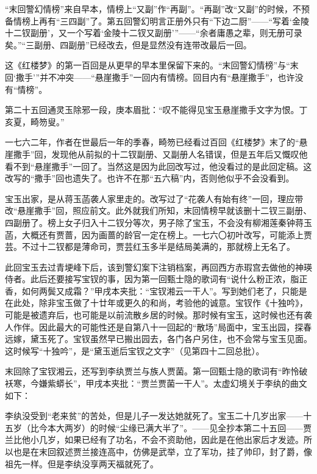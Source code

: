 \par “末回警幻情榜”来自早本，情榜上“又副”作“再副”。“再副”改“又副”的时候，不预备情榜上再有“三四副”了。第五回警幻明言正册外只有“下边二厨”——“写着‘金陵十二钗副册’，又一个写着‘金陵十二钗又副册’”——“余者庸愚之辈，则无册可录矣。”“三副册、四副册”已经改去，但是显然没有连带改最后一回。
\par 这《红楼梦》的第一百回是从更早的早本里保留下来的。“末回警幻情榜”与“末回‘撒手’”并不冲突——“悬崖撒手”一回内有情榜。回目内有“悬崖撒手”，也许没有“情榜”。
\par 第二十五回通灵玉除邪一段，庚本眉批：“叹不能得见宝玉悬崖撒手文字为恨。丁亥夏，畸笏叟。”
\par 一七六二年，作者在世最后一年的季春，畸笏已经看过百回《红楼梦》末了的“悬崖撒手”回，发现他从前拟的十二钗副册、又副册人名错误，但是五年后又慨叹他看不到“悬崖撒手”一回了。当然这是因为此回改写过，他没看过的是此回定稿。这改写的“撒手”回也遗失了。也许不在那“五六稿”内，否则他似乎不会没看到。
\par 宝玉出家，是从蒋玉菡袭人家里走的。改写过了“花袭人有始有终”一回，理应带改“悬崖撒手”回，照应前文。此外就我们所知，末回情榜早就该删十二钗三副册、四副册了。榜上女子归入十二钗分等次，男子除了宝玉，不会没有柳湘莲秦钟蒋玉菡，大概还有贾蔷，因为画蔷的龄官一定在榜上。一七六〇初叶改写，可能添上贾芸。不过十二钗都是薄命司，贾芸红玉多半是结局美满的，那就榜上无名了。
\par 此回宝玉去过青埂峰下后，该到警幻案下注销档案，再回西方赤瑕宫去做他的神瑛侍者。此后还要接写宝钗的事，因为第一回甄士隐的歌词有“说什么粉正浓，脂正香，如何两鬓又成霜？”甲戌本夹批：“宝钗湘云一干人”。写到她们老了，只能是在此处，除非宝玉做了十廿年或更久的和尚，考验他的诚意。宝钗作《十独吟》，可能是被遗弃后，也可能是以前流散乡居的时候。那时候有宝玉，这时候也还有袭人作伴。因此最大的可能性还是自第八十一回起的“散场”局面中，宝玉出园，探春远嫁，黛玉死了。宝钗虽然早已搬出园去，各门各户另住，也不会常与宝玉见面。这时候写“十独吟”，是“黛玉逝后宝钗之文字”（见第四十二回总批）。
\par 末回除了宝钗湘云，还写到李纨贾兰与族人贾菌。第一回甄士隐的歌词有“昨怜破袄寒，今嫌紫蟒长”，甲戌本夹批：“贾兰贾菌一干人”。太虚幻境关于李纨的曲文如下：
\par 李纨没受到“老来贫”的苦处，但是儿子一发达她就死了。宝玉二十几岁出家——十五岁（比今本大两岁）的时候“尘缘已满大半了”。——见全抄本第二十五回——贾兰比他小几岁，如果已经有了功名，不会不资助他，因此是在他出家后才发迹。所以也是在末回叙述贾兰接连高中，仿佛是武举，立了军功，挂了帅印，封了爵，像祖先一样。但是李纨没享两天福就死了。
